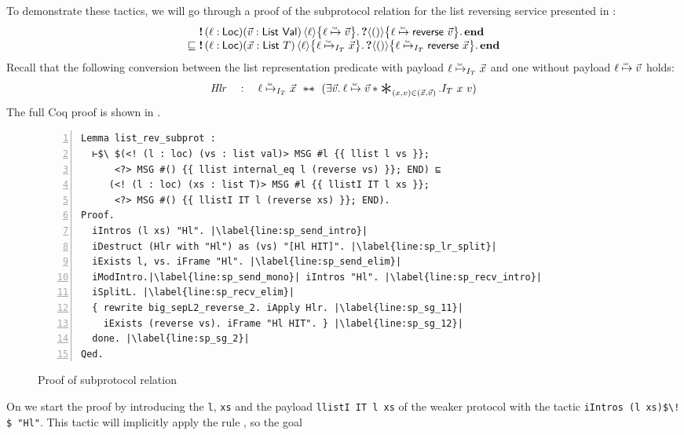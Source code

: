 To demonstrate these tactics, we will go through a proof of the subprotocol relation
for the list reversing service presented in :
\[
  \begin{array}{@{} l @{} l @{}}
  &\sendprot{(\loc:\Loc)(\vec{\val}:\List\ \Val)}{\loc}{\listref{\loc}{\vec{\val}}}
  \recvprot{}{\TT}{\listref{\loc}{\listrev{\vec{\val}}}}
  \protend\\
  \subprotop{} &
  \sendprot{(\loc:\Loc)(\vec{\var}:\List\ \tvar)}{\loc}
  {\listrefI{\interpvar_\tvar}{\loc}{\vec{\var}}}
  \recvprot{}{\TT}
  {\listrefI{\interpvar_\tvar}{\loc}{\listrev{\vec{\var}}}}
  \protend
  \end{array}
\]
Recall that the following conversion between
the list representation predicate with payload $\listrefI{\interpvar_\tvar}{\loc}{\vec{\var}}$
and one without payload $\listref{\loc}{\vec{\val}}$ holds:
\[
  \mathit{Hlr} \quad : \quad
  \textstyle
  \listrefI{\interpvar_\tvar}{\loc}{\vec{\var}} \ \wandIff \
  (\Exists \vec{\val}.
  \listref{\loc}{\vec{\val}} \ast
  \Sep_{(\var,\val) \in (\vec{\var},\vec{\val})}.
  \interpvar_\tvar\ \var\ \val)
\]
The full Coq proof is shown in .
\begin{figure}
\begin{lstlisting}[numbers=left,xleftmargin=1cm,escapechar=|]
Lemma list_rev_subprot :
  ⊢$\ $(<! (l : loc) (vs : list val)> MSG #l {{ llist l vs }};
      <?> MSG #() {{ llist internal_eq l (reverse vs) }}; END) ⊑
     (<! (l : loc) (xs : list T)> MSG #l {{ llistI IT l xs }};
      <?> MSG #() {{ llistI IT l (reverse xs) }}; END).
Proof.
  iIntros (l xs) "Hl". |\label{line:sp_send_intro}|
  iDestruct (Hlr with "Hl") as (vs) "[Hl HIT]". |\label{line:sp_lr_split}|
  iExists l, vs. iFrame "Hl". |\label{line:sp_send_elim}|
  iModIntro.|\label{line:sp_send_mono}| iIntros "Hl". |\label{line:sp_recv_intro}|
  iSplitL. |\label{line:sp_recv_elim}|
  { rewrite big_sepL2_reverse_2. iApply Hlr. |\label{line:sp_sg_11}|
    iExists (reverse vs). iFrame "Hl HIT". } |\label{line:sp_sg_12}|
  done. |\label{line:sp_sg_2}|
Qed.
\end{lstlisting}
\caption{Proof of subprotocol relation}
\label{fig:subprot_proof}
\end{figure}
On  we start the proof by introducing the
\binders \lstinline{l}, \lstinline{xs} and the payload
\lstinline{llistI IT l xs} of the weaker protocol with the tactic
\lstinline{iIntros (l xs)$\! $ "Hl"}.
This tactic will implicitly apply the rule , so the goal
